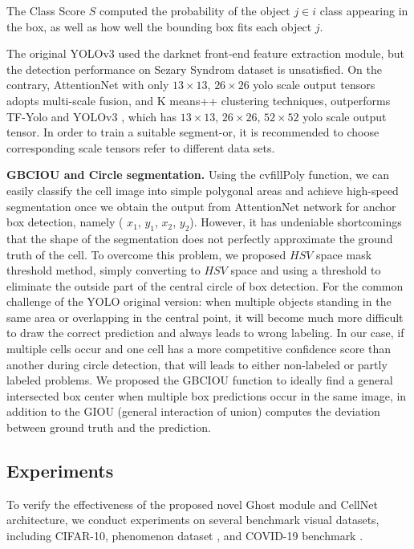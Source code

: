 {The Class Score $S$ computed the probability of the object $j \in  i$ class appearing in the box, as well as how well the bounding box fits each object $j$.

The original YOLOv3\cite{33} used the darknet front-end feature extraction module, but the detection performance on Sezary Syndrom dataset is unsatisfied. On the contrary, AttentionNet with only $13 \times 13$, $26 \times 26$ yolo scale output tensors adopts multi-scale fusion, and K means++ clustering\cite{18} techniques, outperforms TF-Yolo\cite{18} and  YOLOv3 \cite{33}, which has $13 \times 13$, $26 \times 26$, $52 \times 52$ yolo scale output tensor. In order to train a suitable segment-or, it is recommended to choose corresponding scale tensors refer to different data sets. 

\textbf{GBCIOU and Circle segmentation.} Using the cvfillPoly function, we can easily classify the cell image into simple polygonal areas and achieve high-speed segmentation once we obtain the output from AttentionNet network for anchor box detection, namely ( $x_{1}$, $y_{1}$, $x_{2}$, $y_{2}$). However, it has undeniable shortcomings that the shape of the segmentation does not perfectly approximate the ground truth of the cell. To overcome this problem, we proposed $HSV$ space mask threshold method, simply converting to $HSV$ space and using a threshold to eliminate the outside part of the central circle of box detection.  For the common challenge of the YOLO original version: when multiple objects standing in the same area or overlapping in the central point, it will become much more difficult to draw the correct prediction and always leads to wrong labeling. In our case, if multiple cells occur and one cell has a more competitive confidence score than another during circle detection, that will leads to either non-labeled or partly labeled problems.
We proposed the GBCIOU function to ideally find a general intersected box center when multiple box predictions occur in the same image, in addition to the GIOU (general interaction of union) computes the deviation between ground truth and the prediction.



\subsection{Experiments}
To verify the effectiveness of the proposed novel Ghost module and CellNet architecture, we conduct experiments on several benchmark visual datasets, including CIFAR-10\cite{21}, phenomenon dataset \cite{38}, and COVID-19 benchmark \cite{36}\cite{37}. 


}
